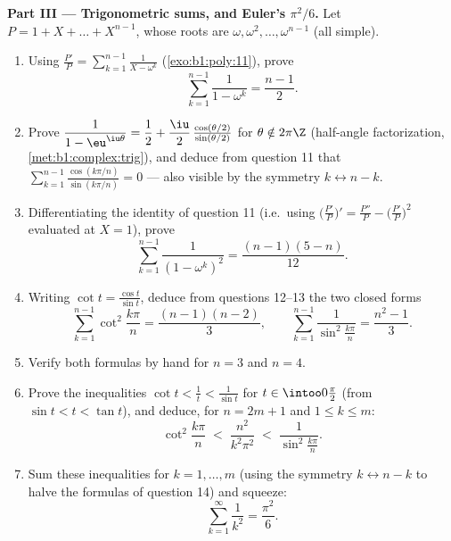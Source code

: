 \begin{problem}
\medskip
\noindent\textbf{Part III --- Trigonometric sums, and Euler's
$\pi^2/6$.} Let $P = 1 + X + \dots + X^{n-1}$, whose roots are
$\omega, \omega^2, \dots, \omega^{n-1}$ (all simple).
\begin{enumerate}[resume]
  \item Using $\frac{P'}P = \sum_{k=1}^{n-1}\frac1{X - \omega^k}$
        (\cref{exo:b1:poly:11}), prove
        \[
        \sum_{k=1}^{n-1}\frac{1}{1 - \omega^k} = \frac{n-1}2 .
        \]
  \item Prove $\dfrac1{1 - \eu^{\iu\theta}} = \dfrac12 +
        \dfrac\iu2\,\frac{\cos(\theta/2)}{\sin(\theta/2)}$ for
        $\theta \notin 2\pi\Z$ (half-angle factorization,
        \cref{met:b1:complex:trig}), and deduce from question 11
        that $\sum_{k=1}^{n-1}
        \frac{\cos(k\pi/n)}{\sin(k\pi/n)} = 0$ --- also visible
        by the symmetry $k \leftrightarrow n - k$.
  \item Differentiating the identity of question 11 (i.e.\ using
        $\bigl(\frac{P'}P\bigr)' = \frac{P''}P -
        \bigl(\frac{P'}P\bigr)^2$ evaluated at $X = 1$), prove
        \[
        \sum_{k=1}^{n-1}\frac{1}{(1 - \omega^k)^2}
        = \frac{(n-1)(5-n)}{12} .
        \]
  \item Writing $\cot t = \frac{\cos t}{\sin t}$, deduce from
        questions 12--13 the two closed forms
        \[
        \sum_{k=1}^{n-1}\cot^2\frac{k\pi}n = \frac{(n-1)(n-2)}3,
        \qquad
        \sum_{k=1}^{n-1}\frac1{\sin^2\frac{k\pi}n}
        = \frac{n^2-1}3 .
        \]
  \item Verify both formulas by hand for $n = 3$ and $n = 4$.
  \item Prove the inequalities $\cot t < \frac1t < \frac1{\sin t}$
        for $t \in \intoo0{\frac\pi2}$ (from $\sin t < t < \tan
        t$), and deduce, for $n = 2m + 1$ and $1 \leq k \leq m$:
        \[
        \cot^2\frac{k\pi}n \;<\; \frac{n^2}{k^2\pi^2}
        \;<\; \frac1{\sin^2\frac{k\pi}n} .
        \]
  \item Sum these inequalities for $k = 1, \dots, m$ (using the
        symmetry $k \leftrightarrow n - k$ to halve the formulas
        of question 14) and squeeze:
        \[
        \sum_{k=1}^{\infty}\frac1{k^2} = \frac{\pi^2}6 .
        \]
\end{enumerate}


\end{problem}
